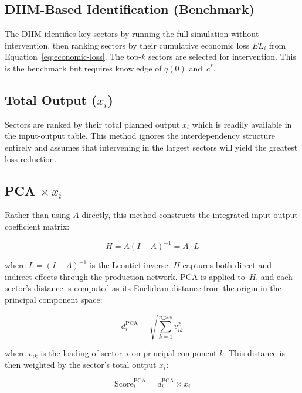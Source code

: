 \subsection{DIIM-Based Identification (Benchmark)}

The DIIM identifies key sectors by running the full simulation without intervention, then ranking sectors by their cumulative economic loss $EL_i$ from Equation~\eqref{eq:economic-loss}. The top-$k$ sectors are selected for intervention. This is the benchmark but requires knowledge of $q(0)$ and~$c^{*}$.

\subsection{Total Output ($x_i$)}

Sectors are ranked by their total planned output $x_i$ which is readily available in the input-output table. This method ignores the interdependency structure entirely and assumes that intervening in the largest sectors will yield the greatest loss reduction.

\subsection{PCA $\times\, x_i$}

Rather than using $A$ directly, this method constructs the integrated input-output coefficient matrix:

\begin{equation}
    H = A (I - A)^{-1} = A \cdot L
    \label{eq:integrated-io-matrix}
\end{equation}

where $L = (I - A)^{-1}$ is the Leontief inverse. $H$ captures both direct and indirect effects through the production network. PCA is applied to~$H$, and each sector's distance is computed as its Euclidean distance from the origin in the principal component space:

\begin{equation}
    d_i^{\text{PCA}} = \sqrt{ \sum_{k=1}^{n\_pcs} v_{ik}^2 }
    \label{eq:pca-distance}
\end{equation}

where $v_{ik}$ is the loading of sector~$i$ on principal component $k$. This distance is then weighted by the sector's total output $x_i$:

\begin{equation}
    \text{Score}_i^{\text{PCA}} = d_i^{\text{PCA}} \times x_i
    \label{eq:pca-xi-score}
\end{equation}

